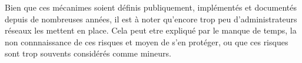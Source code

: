 Bien que ces mécanimes soient définis publiquement, implémentés et documentés depuis de nombreuses années, il est à noter qu'encore trop peu d'administrateurs réseaux les mettent en place. Cela peut etre expliqué par le manque de temps, la non connnaissance de ces risques et moyen de s'en protéger, ou que ces risques sont trop souvents considérés comme mineurs.







